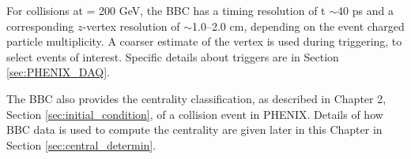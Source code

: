 For \pau collisions at \sqsn = 200 GeV, the BBC has a timing resolution of t $\sim$40 ps and a corresponding $z$-vertex resolution of $\sim$1.0--2.0 cm, depending on the event charged particle multiplicity. A coarser estimate of the vertex is used during triggering, to select events of interest. Specific details about triggers are in Section \ref{sec:PHENIX_DAQ}.

The BBC also provides the centrality classification, as described in Chapter 2, Section \ref{sec:initial_condition}, of a collision event in PHENIX. Details of how BBC data is used to compute the centrality are given later in this Chapter in Section \ref{sec:central_determin}.

